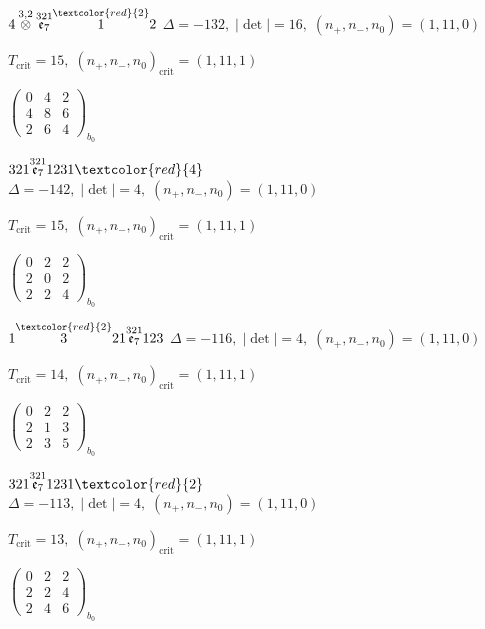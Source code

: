 \documentclass[10pt]{article}
\begin{document}
\smallskip

$4\overset{3,2}{\otimes}\overset{321}{\mathfrak{e}_7}\overset{\textcolor{red}{2}}{1}2$ \quad $\Delta=-132,\; |\det|=16,\; (n_+,n_-,n_0)=(1,11,0)$

\hspace{1em}$T_{\text{crit}}=15,\; (n_+,n_-,n_0)_{\text{crit}}=(1,11,1)$

\hspace{2em}$\left(\begin{smallmatrix}0 & 4 & 2 \\ 4 & 8 & 6 \\ 2 & 6 & 4\end{smallmatrix}\right)_{\!b_0}$

\smallskip

$321\overset{321}{\mathfrak{e}_7}1231\textcolor{red}{4}$ \quad $\Delta=-142,\; |\det|=4,\; (n_+,n_-,n_0)=(1,11,0)$

\hspace{1em}$T_{\text{crit}}=15,\; (n_+,n_-,n_0)_{\text{crit}}=(1,11,1)$

\hspace{2em}$\left(\begin{smallmatrix}0 & 2 & 2 \\ 2 & 0 & 2 \\ 2 & 2 & 4\end{smallmatrix}\right)_{\!b_0}$

$1\overset{\textcolor{red}{2}}{3}21\overset{321}{\mathfrak{e}_7}123$ \quad $\Delta=-116,\; |\det|=4,\; (n_+,n_-,n_0)=(1,11,0)$

\hspace{1em}$T_{\text{crit}}=14,\; (n_+,n_-,n_0)_{\text{crit}}=(1,11,1)$

\hspace{2em}$\left(\begin{smallmatrix}0 & 2 & 2 \\ 2 & 1 & 3 \\ 2 & 3 & 5\end{smallmatrix}\right)_{\!b_0}$

$321\overset{321}{\mathfrak{e}_7}1231\textcolor{red}{2}$ \quad $\Delta=-113,\; |\det|=4,\; (n_+,n_-,n_0)=(1,11,0)$

\hspace{1em}$T_{\text{crit}}=13,\; (n_+,n_-,n_0)_{\text{crit}}=(1,11,1)$

\hspace{2em}$\left(\begin{smallmatrix}0 & 2 & 2 \\ 2 & 2 & 4 \\ 2 & 4 & 6\end{smallmatrix}\right)_{\!b_0}$
\end{document}
